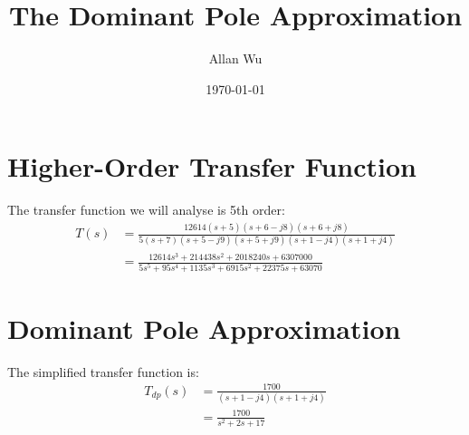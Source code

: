 \documentclass{report}
\title{The Dominant Pole Approximation}
\author{Allan Wu}
\date{\today}
\begin{document}
\maketitle{}

\section*{Higher-Order Transfer Function}

The transfer function we will analyse is 5th order:
\begin{align*}
T(s) &= \frac{12614(s+5)(s+6-j8)(s+6+j8)}{5(s+7)(s+5-j9)(s+5+j9)(s+1-j4)(s+1+j4)} \\
&= \frac{12614 s^3 + 214438 s^2 + 2018240 s + 6307000}{5 s^5 + 95 s^4 + 1135 s^3 + 6915 s^2 + 22375 s + 63070}
\end{align*}

\section*{Dominant Pole Approximation}

The simplified transfer function is:
\begin{align*}
T_{dp}(s) &= \frac{1700}{(s+1-j4)(s+1+j4)} \\
&= \frac{1700}{s^2 + 2s + 17}
\end{align*}
\end{document}
